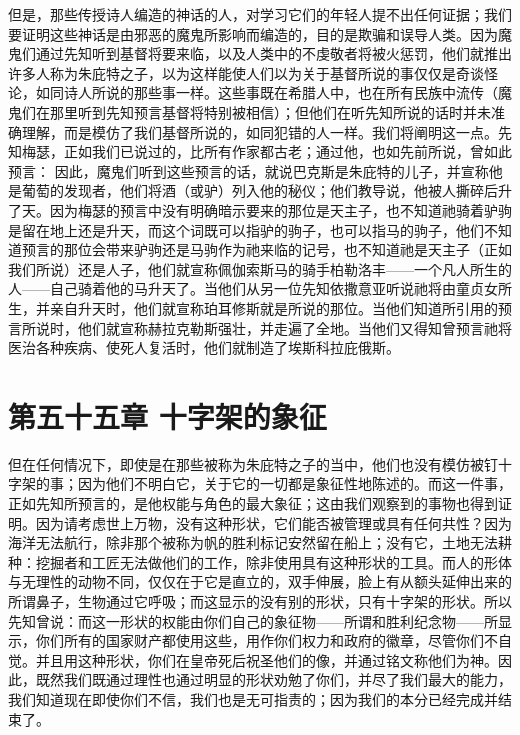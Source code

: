 但是，那些传授诗人编造的神话的人，对学习它们的年轻人提不出任何证据；我们要证明这些神话是由邪恶的魔鬼所影响而编造的，目的是欺骗和误导人类。因为魔鬼们通过先知听到基督将要来临，以及人类中的不虔敬者将被火惩罚，他们就推出许多人称为朱庇特之子，以为这样能使人们以为关于基督所说的事仅仅是奇谈怪论，如同诗人所说的那些事一样。这些事既在希腊人中，也在所有民族中流传（魔鬼们在那里听到先知预言基督将特别被相信）；但他们在听先知所说的话时并未准确理解，而是模仿了我们基督所说的，如同犯错的人一样。我们将阐明这一点。先知梅瑟，正如我们已说过的，比所有作家都古老；通过他，也如先前所说，曾如此预言： 因此，魔鬼们听到这些预言的话，就说巴克斯是朱庇特的儿子，并宣称他是葡萄的发现者，他们将酒（或驴）列入他的秘仪；他们教导说，他被人撕碎后升了天。因为梅瑟的预言中没有明确暗示要来的那位是天主子，也不知道祂骑着驴驹是留在地上还是升天，而这个词既可以指驴的驹子，也可以指马的驹子，他们不知道预言的那位会带来驴驹还是马驹作为祂来临的记号，也不知道祂是天主子（正如我们所说）还是人子，他们就宣称佩伽索斯马的骑手柏勒洛丰——一个凡人所生的人——自己骑着他的马升天了。当他们从另一位先知依撒意亚听说祂将由童贞女所生，并亲自升天时，他们就宣称珀耳修斯就是所说的那位。当他们知道所引用的预言所说时，他们就宣称赫拉克勒斯强壮，并走遍了全地。当他们又得知曾预言祂将医治各种疾病、使死人复活时，他们就制造了埃斯科拉庇俄斯。\par


\section{第五十五章 十字架的象征}

但在任何情况下，即使是在那些被称为朱庇特之子的当中，他们也没有模仿被钉十字架的事；因为他们不明白它，关于它的一切都是象征性地陈述的。而这一件事，正如先知所预言的，是他权能与角色的最大象征；这由我们观察到的事物也得到证明。因为请考虑世上万物，没有这种形状，它们能否被管理或具有任何共性？因为海洋无法航行，除非那个被称为帆的胜利标记安然留在船上；没有它，土地无法耕种：挖掘者和工匠无法做他们的工作，除非使用具有这种形状的工具。而人的形体与无理性的动物不同，仅仅在于它是直立的，双手伸展，脸上有从额头延伸出来的所谓鼻子，生物通过它呼吸；而这显示的没有别的形状，只有十字架的形状。所以先知曾说：而这一形状的权能由你们自己的象征物——所谓和胜利纪念物——所显示，你们所有的国家财产都使用这些，用作你们权力和政府的徽章，尽管你们不自觉。并且用这种形状，你们在皇帝死后祝圣他们的像，并通过铭文称他们为神。因此，既然我们既通过理性也通过明显的形状劝勉了你们，并尽了我们最大的能力，我们知道现在即使你们不信，我们也是无可指责的；因为我们的本分已经完成并结束了。\par

